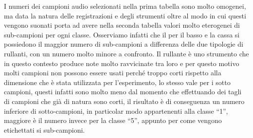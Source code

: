 I numeri dei campioni audio selezionati nella prima tabella sono molto omogenei, ma data la natura delle registrazioni e degli strumenti oltre al modo in cui questi vengono suonati porta ad avere nella seconda tabella valori molto eterogenei di sub-campioni per ogni classe. Osserviamo infatti che il per il basso e la cassa si possiedono il maggior numero di sub-campioni a differenza delle due tipologie di rullanti, con un numero molto minore a confronto. Il rullante è uno strumento che in questo contesto produce note molto ravvicinate tra loro e per questo motivo molti campioni non possono essere usati perché troppo corti rispetto alla dimensione che è stata utilizzata per l'esperimento, lo stesso vale per i sotto campioni, questi infatti sono molto meno dal momento che effettuando dei tagli di campioni che già di natura sono corti, il risultato è di conseguenza un numero inferiore di sotto-campioni, in particolar modo appartenenti alla classe ``1'', maggiore è il numero invece per la classe ``5'', appunto per come vengono etichettati si sub-campioni.\\

